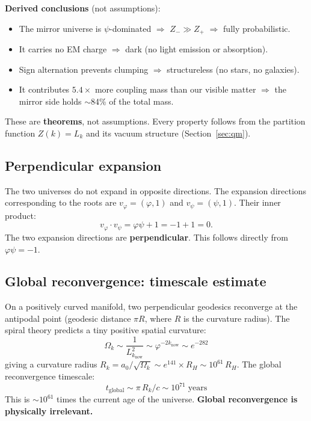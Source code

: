 \documentclass[12pt,a4paper]{article}
\begin{document}
\textbf{Derived conclusions} (not assumptions):
\begin{itemize}
\item The mirror universe is $\psi$-dominated $\Rightarrow$ $Z_- \gg Z_+$ $\Rightarrow$ fully probabilistic.
\item It carries no EM charge $\Rightarrow$ dark (no light emission or absorption).
\item Sign alternation prevents clumping $\Rightarrow$ structureless (no stars, no galaxies).
\item It contributes $5.4\times$ more coupling mass than our visible matter $\Rightarrow$ the mirror side holds $\sim$84\% of the total mass.
\end{itemize}

\noindent These are \textbf{theorems}, not assumptions. Every property follows from the partition function $Z(k) = L_k$ and its vacuum structure (Section~\ref{sec:qm}).

\subsection{Perpendicular expansion}

The two universes do not expand in opposite directions. The expansion directions corresponding to the roots are $v_\varphi = (\varphi, 1)$ and $v_\psi = (\psi, 1)$. Their inner product:
\begin{equation}
v_\varphi \cdot v_\psi = \varphi\psi + 1 = -1 + 1 = 0.
\end{equation}
The two expansion directions are \textbf{perpendicular}. This follows directly from $\varphi\psi = -1$.

\subsection{Global reconvergence: timescale estimate}

On a positively curved manifold, two perpendicular geodesics reconverge at the antipodal point (geodesic distance $\pi R$, where $R$ is the curvature radius). The spiral theory predicts a tiny positive spatial curvature:
\begin{equation}
\Omega_k \sim \frac{1}{L_{k_{\mathrm{now}}}^2} \sim \varphi^{-2k_{\mathrm{now}}} \sim e^{-282}
\end{equation}
giving a curvature radius $R_k = a_0/\sqrt{\Omega_k} \sim e^{141} \times R_H \sim 10^{61}\,R_H$. The global reconvergence timescale:
\begin{equation}
\boxed{t_{\mathrm{global}} \sim \pi\, R_k / c \sim 10^{71} \;\text{years}}
\end{equation}
This is $\sim 10^{61}$ times the current age of the universe. \textbf{Global reconvergence is physically irrelevant.}
\end{document}
